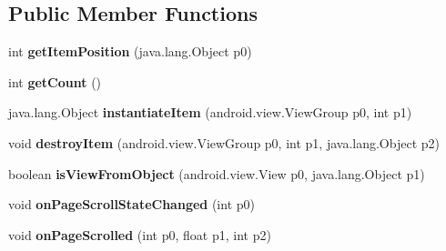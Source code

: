 \subsection*{Public Member Functions}
\begin{DoxyCompactItemize}
\item 
\hypertarget{classmd5282f1122c1313907b9bf274dd2c2f344_1_1CarouselPageAdapter_a240f501444643595212d110ec35d8a54}{}int {\bfseries get\+Item\+Position} (java.\+lang.\+Object p0)\label{classmd5282f1122c1313907b9bf274dd2c2f344_1_1CarouselPageAdapter_a240f501444643595212d110ec35d8a54}

\item 
\hypertarget{classmd5282f1122c1313907b9bf274dd2c2f344_1_1CarouselPageAdapter_acb0f20efbebb662fb5458389e73f867b}{}int {\bfseries get\+Count} ()\label{classmd5282f1122c1313907b9bf274dd2c2f344_1_1CarouselPageAdapter_acb0f20efbebb662fb5458389e73f867b}

\item 
\hypertarget{classmd5282f1122c1313907b9bf274dd2c2f344_1_1CarouselPageAdapter_afae6c7c4642e87dea8011f0c9574b388}{}java.\+lang.\+Object {\bfseries instantiate\+Item} (android.\+view.\+View\+Group p0, int p1)\label{classmd5282f1122c1313907b9bf274dd2c2f344_1_1CarouselPageAdapter_afae6c7c4642e87dea8011f0c9574b388}

\item 
\hypertarget{classmd5282f1122c1313907b9bf274dd2c2f344_1_1CarouselPageAdapter_ac55e2ef160e33b63554c7c955a6bb943}{}void {\bfseries destroy\+Item} (android.\+view.\+View\+Group p0, int p1, java.\+lang.\+Object p2)\label{classmd5282f1122c1313907b9bf274dd2c2f344_1_1CarouselPageAdapter_ac55e2ef160e33b63554c7c955a6bb943}

\item 
\hypertarget{classmd5282f1122c1313907b9bf274dd2c2f344_1_1CarouselPageAdapter_ac9e59bb97e1614d7bf20adc3a6293866}{}boolean {\bfseries is\+View\+From\+Object} (android.\+view.\+View p0, java.\+lang.\+Object p1)\label{classmd5282f1122c1313907b9bf274dd2c2f344_1_1CarouselPageAdapter_ac9e59bb97e1614d7bf20adc3a6293866}

\item 
\hypertarget{classmd5282f1122c1313907b9bf274dd2c2f344_1_1CarouselPageAdapter_a6deb89a63898edce0fa8289332b79a99}{}void {\bfseries on\+Page\+Scroll\+State\+Changed} (int p0)\label{classmd5282f1122c1313907b9bf274dd2c2f344_1_1CarouselPageAdapter_a6deb89a63898edce0fa8289332b79a99}

\item 
\hypertarget{classmd5282f1122c1313907b9bf274dd2c2f344_1_1CarouselPageAdapter_a6b11803d584fa440f98174a7c7135f94}{}void {\bfseries on\+Page\+Scrolled} (int p0, float p1, int p2)\label{classmd5282f1122c1313907b9bf274dd2c2f344_1_1CarouselPageAdapter_a6b11803d584fa440f98174a7c7135f94}


\end{DoxyCompactItemize}
